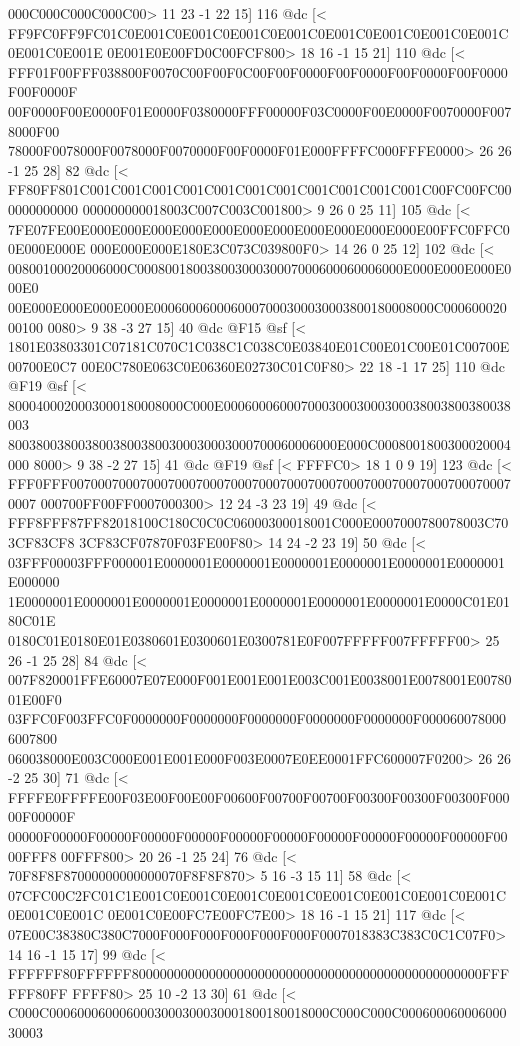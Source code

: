 {{{{{{{{{{{{{{{{{{{{{{{000C000C000C000C00>
	 11 23 -1 22 15] 116 @dc
[<
FF9FC0FF9FC01C0E001C0E001C0E001C0E001C0E001C0E001C0E001C0E001C0E001C0E001E
0E001E0E00FD0C00FCF800>
	 18 16 -1 15 21] 110 @dc
[<
FFF01F00FFF038800F0070C00F00F0C00F00F0000F00F0000F00F0000F00F0000F00F0000F
00F0000F00E0000F01E0000F0380000FFF00000F03C0000F00E0000F0070000F0078000F00
78000F0078000F0078000F0070000F00F0000F01E000FFFFC000FFFE0000>
	 26 26 -1 25 28] 82 @dc
[<
FF80FF801C001C001C001C001C001C001C001C001C001C001C001C00FC00FC000000000000
000000000018003C007C003C001800>
	 9 26 0 25 11] 105 @dc
[<
7FE07FE00E000E000E000E000E000E000E000E000E000E000E000E00FFC0FFC00E000E000E
000E000E000E180E3C073C039800F0>
	 14 26 0 25 12] 102 @dc
[<
00800100020006000C00080018003800300030007000600060006000E000E000E000E000E0
00E000E000E000E000E0006000600060007000300030003800180008000C00060002000100
0080>
	 9 38 -3 27 15] 40 @dc
@F15 @sf
[<
1801E03803301C07181C070C1C038C1C038C0E03840E01C00E01C00E01C00700E00700E0C7
00E0C780E063C0E06360E02730C01C0F80>
	 22 18 -1 17 25] 110 @dc
@F19 @sf
[<
8000400020003000180008000C000E00060006000700030003000300038003800380038003
80038003800380038003800300030003000700060006000E000C0008001800300020004000
8000>
	 9 38 -2 27 15] 41 @dc
@F19 @sf
[<
FFFFC0>
	 18 1 0 9 19] 123 @dc
[<
FFF0FFF0070007000700070007000700070007000700070007000700070007000700070007
000700FF00FF0007000300>
	 12 24 -3 23 19] 49 @dc
[<
FFF8FFF87FF82018100C180C0C0C06000300018001C000E0007000780078003C703CF83CF8
3CF83CF07870F03FE00F80>
	 14 24 -2 23 19] 50 @dc
[<
03FFF00003FFF000001E0000001E0000001E0000001E0000001E0000001E0000001E000000
1E0000001E0000001E0000001E0000001E0000001E0000001E0000001E0000C01E0180C01E
0180C01E0180E01E0380601E0300601E0300781E0F007FFFFF007FFFFF00>
	 25 26 -1 25 28] 84 @dc
[<
007F820001FFE60007E07E000F001E001E001E003C001E0038001E0078001E0078001E00F0
03FFC0F003FFC0F0000000F0000000F0000000F0000000F0000000F0000600780006007800
060038000E003C000E001E001E000F003E0007E0EE0001FFC600007F0200>
	 26 26 -2 25 30] 71 @dc
[<
FFFFE0FFFFE00F03E00F00E00F00600F00700F00700F00300F00300F00300F00000F00000F
00000F00000F00000F00000F00000F00000F00000F00000F00000F00000F00000F0000FFF8
00FFF800>
	 20 26 -1 25 24] 76 @dc
[<
70F8F8F87000000000000070F8F8F870>
	 5 16 -3 15 11] 58 @dc
[<
07CFC00C2FC01C1E001C0E001C0E001C0E001C0E001C0E001C0E001C0E001C0E001C0E001C
0E001C0E00FC7E00FC7E00>
	 18 16 -1 15 21] 117 @dc
[<
07E00C38380C380C7000F000F000F000F000F000F0007018383C383C0C1C07F0>
	 14 16 -1 15 17] 99 @dc
[<
FFFFFF80FFFFFF80000000000000000000000000000000000000000000000000FFFFFF80FF
FFFF80>
	 25 10 -2 13 30] 61 @dc
[<
C000C0006000600060003000300030001800180018000C000C000C00060006000600030003
}}}}}}}}}}}}}}}}}}}}}}}

